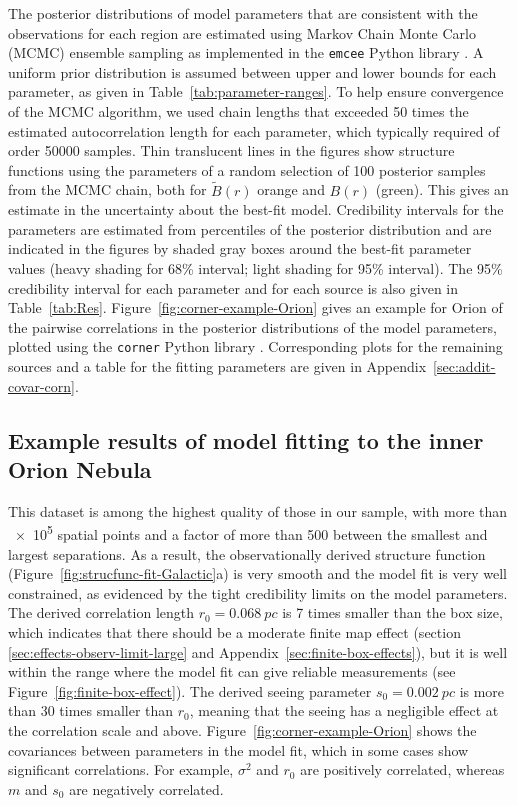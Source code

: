 \documentclass[fleqn,usenatbib, useAMS, a4paper]{mnras}
\begin{document}
The posterior distributions of model parameters
that are consistent with the observations for each region are estimated
using Markov Chain Monte Carlo (MCMC) ensemble sampling \citep{2010CAMCS...5...65G}
as implemented in the \texttt{emcee} Python library \citep{2013PASP..125..306F}.
A uniform prior distribution is assumed between upper and lower bounds
for each parameter, as given in Table~\ref{tab:parameter-ranges}.
To help ensure convergence of the MCMC algorithm,
we used chain lengths that exceeded \num{50} times the
estimated autocorrelation length for each parameter,
which typically required of order \num{50000} samples.
Thin translucent lines in the figures show structure functions using the parameters of
a random selection of \num{100} posterior samples from the MCMC chain,
both for \(\tilde{B}(r)\) orange and \(B(r)\) (green).
This gives an estimate in the uncertainty about the best-fit model.
Credibility intervals for the parameters are estimated from percentiles
of the posterior distribution and are indicated in the figures by shaded gray boxes
around the best-fit parameter values
(heavy shading for 68\% interval; light shading for 95\% interval).
The 95\% credibility interval for each parameter and for each source
is also given in Table~\ref{tab:Res}.
Figure~\ref{fig:corner-example-Orion} gives an example for Orion of
the pairwise correlations in the posterior distributions of the model parameters,
plotted using the \texttt{corner} Python library \citep{2017ascl.soft02002F}.
Corresponding plots for the remaining sources and a table for the fitting parameters are given in Appendix~\ref{sec:addit-covar-corn}.


\subsection{Example results of model fitting to the inner Orion Nebula}
\label{sec:example-results-orion}

This dataset is among the highest quality of those in our sample,
with more than \num{e5} spatial points and a factor of more than \num{500}
between the smallest and largest separations.
As a result, the observationally derived structure function (Figure~\ref{fig:strucfunc-fit-Galactic}a)
is very smooth and the model fit is very well constrained,
as evidenced by the tight credibility limits on the model parameters.
The derived correlation length \(r_0 = \SI{0.068}{pc}\) is \num{7} times smaller
than the box size, which indicates that there should be a moderate finite map effect
(section \ref{sec:effects-observ-limit-large} and Appendix~\ref{sec:finite-box-effects}),
but it is well within the range where the model fit can give reliable measurements
(see Figure~\ref{fig:finite-box-effect}).
The derived seeing parameter \(s_0 = \SI{0.002}{pc}\) is more than \num{30} times smaller
than \(r_0\), meaning that the seeing has a negligible effect at the correlation scale and above.
Figure~\ref{fig:corner-example-Orion}  shows  the covariances  between
parameters  in the  model fit,
which in some cases show significant correlations.
For example, \(\sigma^2\) and \(r_0\) are positively correlated,
whereas \(m\) and \(s_0\) are negatively correlated. 
\end{document}
